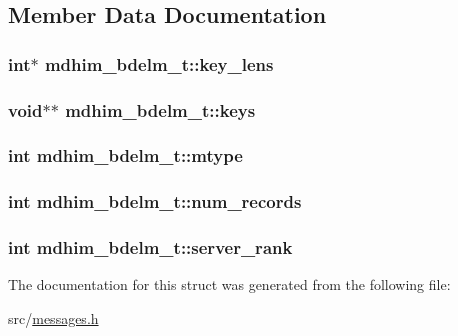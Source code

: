 \subsection{Member Data Documentation}
\hypertarget{structmdhim__bdelm__t_a12057b9c3f79456910521cd628b31415}{
\subsubsection[{key\-\_\-lens}]{\setlength{\rightskip}{0pt plus 5cm}int$\ast$ mdhim\-\_\-bdelm\-\_\-t\-::key\-\_\-lens}}\label{d4/ddf/structmdhim__bdelm__t_a12057b9c3f79456910521cd628b31415}
\hypertarget{structmdhim__bdelm__t_a7e218a41a470e47c65040491f879985d}{
\subsubsection[{keys}]{\setlength{\rightskip}{0pt plus 5cm}void$\ast$$\ast$ mdhim\-\_\-bdelm\-\_\-t\-::keys}}\label{d4/ddf/structmdhim__bdelm__t_a7e218a41a470e47c65040491f879985d}
\hypertarget{structmdhim__bdelm__t_a9723fe671281596fa43c80b13ea7eb9c}{
\subsubsection[{mtype}]{\setlength{\rightskip}{0pt plus 5cm}int mdhim\-\_\-bdelm\-\_\-t\-::mtype}}\label{d4/ddf/structmdhim__bdelm__t_a9723fe671281596fa43c80b13ea7eb9c}
\hypertarget{structmdhim__bdelm__t_a3a51d42f3dee8ffd91aa208cdd2be0a3}{
\subsubsection[{num\-\_\-records}]{\setlength{\rightskip}{0pt plus 5cm}int mdhim\-\_\-bdelm\-\_\-t\-::num\-\_\-records}}\label{d4/ddf/structmdhim__bdelm__t_a3a51d42f3dee8ffd91aa208cdd2be0a3}
\hypertarget{structmdhim__bdelm__t_a5c455aeb5d7804c4d448d5b3f624c6e6}{
\subsubsection[{server\-\_\-rank}]{\setlength{\rightskip}{0pt plus 5cm}int mdhim\-\_\-bdelm\-\_\-t\-::server\-\_\-rank}}\label{d4/ddf/structmdhim__bdelm__t_a5c455aeb5d7804c4d448d5b3f624c6e6}


The documentation for this struct was generated from the following file\-:\begin{DoxyCompactItemize}
\item 
src/\hyperlink{messages_8h}{messages.\-h}\end{DoxyCompactItemize}
